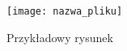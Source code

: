 \begin{figure}[htb]           %
\texttt{[image: nazwa\_pliku]} %
\caption{Przykładowy rysunek} %
\label{fig:rys_1}             %
\end{figure}                  %
